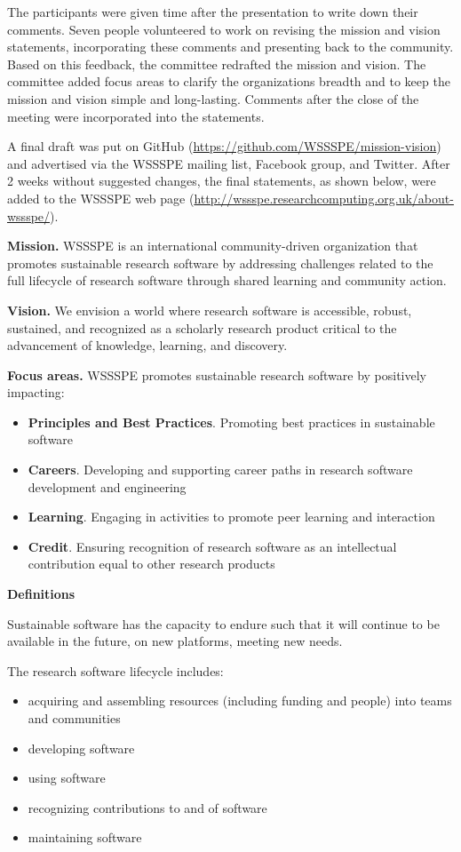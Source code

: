 \documentclass[11pt, oneside]{amsart}
\begin{document}
The participants were given time after the presentation to write down their comments.
Seven people volunteered to work on revising the mission and vision statements, incorporating these comments and presenting back to the community.
Based on this feedback, the committee redrafted the mission and vision.
The committee added focus areas to clarify the organizations breadth and to keep the mission and vision simple and long-lasting.
Comments after the close of the meeting were incorporated into the statements.

A final draft was put on GitHub (\url{https://github.com/WSSSPE/mission-vision}) and advertised
via the WSSSPE mailing list, Facebook group, and Twitter.
After 2 weeks without suggested changes, the final statements, as shown below, were added
to the WSSSPE web page (\url{http://wssspe.researchcomputing.org.uk/about-wssspe/}).

{\bf Mission.}
WSSSPE is an international community-driven organization that promotes sustainable research software by addressing challenges related to the full lifecycle of research software through shared learning and community action.

{\bf Vision.}
We envision a world where research software is accessible, robust, sustained, and recognized as a scholarly research product critical to the advancement of knowledge, learning, and discovery.

{\bf Focus areas.}
WSSSPE promotes sustainable research software by positively impacting:
\begin{itemize}
\item {\bf Principles and Best Practices}. Promoting best practices in sustainable software
\item {\bf Careers}. Developing and supporting career paths in research software development and engineering
\item {\bf Learning}. Engaging in activities to promote peer learning and interaction
\item {\bf Credit}. Ensuring recognition of research software as an intellectual contribution equal to other research products
\end{itemize}

{\bf Definitions}

Sustainable software has the capacity to endure such that it will continue to be available in the future, on new platforms, meeting new needs.

The research software lifecycle includes:
\begin{itemize}
\item acquiring and assembling resources (including funding and people) into teams and communities
\item developing software
\item using software
\item recognizing contributions to and of software
\item maintaining software
\end{itemize}
\end{document}
